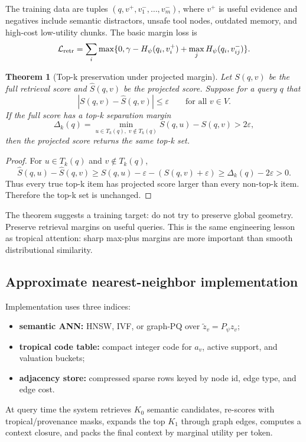 \documentclass[11pt]{article}
\newtheorem{theorem}{Theorem}[section]
\theoremstyle{definition}
\theoremstyle{remark}
\newcommand{\eps}{\varepsilon}
\begin{document}
The training data are tuples \((q,v^+,v^-_1,\ldots,v^-_m)\), where \(v^+\) is useful evidence and negatives include semantic distractors, unsafe tool nodes, outdated memory, and high-cost low-utility chunks. The basic margin loss is
\[
    \mathcal L_{\rm retr}=\sum_i\max\{0,\gamma-H_\psi(q_i,v_i^+)+\max_j H_\psi(q_i,v^-_{ij})\}.
\]

\begin{theorem}[Top-k preservation under projected margin]
Let \(S(q,v)\) be the full retrieval score and \(\widehat S(q,v)\) be the projected score. Suppose for a query \(q\) that
\[
    |S(q,v)-\widehat S(q,v)|\le \eps\qquad\text{for all }v\in V.
\]
If the full score has a top-k separation margin
\[
    \Delta_k(q)=\min_{u\in T_k(q),\; v\notin T_k(q)} S(q,u)-S(q,v)>2\eps,
\]
then the projected score returns the same top-k set.
\end{theorem}
\begin{proof}
For \(u\in T_k(q)\) and \(v\notin T_k(q)\),
\[
    \widehat S(q,u)-\widehat S(q,v)
    \ge S(q,u)-\eps - (S(q,v)+\eps)
    \ge \Delta_k(q)-2\eps>0.
\]
Thus every true top-k item has projected score larger than every non-top-k item. Therefore the top-k set is unchanged.
\end{proof}

The theorem suggests a training target: do not try to preserve global geometry. Preserve retrieval margins on useful queries. This is the same engineering lesson as tropical attention: sharp max-plus margins are more important than smooth distributional similarity.

\subsection{Approximate nearest-neighbor implementation}

Implementation uses three indices:
\begin{itemize}
    \item \textbf{semantic ANN:} HNSW, IVF, or graph-PQ over \(\tilde z_v=P_\psi z_v\);
    \item \textbf{tropical code table:} compact integer code for \(a_v\), active support, and valuation buckets;
    \item \textbf{adjacency store:} compressed sparse rows keyed by node id, edge type, and edge cost.
\end{itemize}
At query time the system retrieves \(K_0\) semantic candidates, re-scores with tropical/provenance masks, expands the top \(K_1\) through graph edges, computes a context closure, and packs the final context by marginal utility per token.
\end{document}
